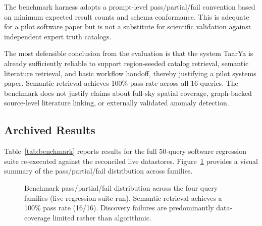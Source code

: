 \documentclass[preprint,12pt,authoryear]{elsarticle}
\begin{document}
The benchmark harness adopts a prompt-level pass/partial/fail convention based on minimum expected result counts and schema conformance. This is adequate for a pilot software paper but is not a substitute for scientific validation against independent expert truth catalogs.

The most defensible conclusion from the evaluation is that the system \textsf{TaarYa} is already sufficiently reliable to support region-seeded catalog retrieval, semantic literature retrieval, and basic workflow handoff, thereby justifying a pilot systems paper. Semantic retrieval achieves 100\% pass rate across all 16 queries. The benchmark does not justify claims about full-sky spatial coverage, graph-backed source-level literature linking, or externally validated anomaly detection.

\subsection{Archived Results}
\label{sec:results}

Table~\ref{tab:benchmark} reports results for the full 50-query software regression suite re-executed against the reconciled live datastores. Figure~\ref{fig:benchmark_bar} provides a visual summary of the pass/partial/fail distribution across families.



\begin{figure}[htbp]
\centering
{}
\caption{\label{fig:benchmark_bar}Benchmark pass/partial/fail distribution across the four query families (live regression suite run). Semantic retrieval achieves a 100\% pass rate (16/16). Discovery failures are predominantly data-coverage limited rather than algorithmic.}
\end{figure}
\end{document}
